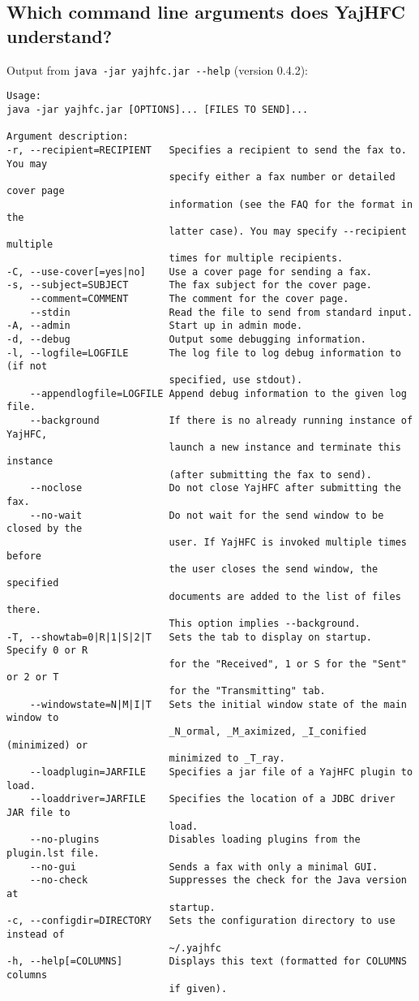 \documentclass[a4paper,10pt]{scrartcl}
\begin{document}
\subsection{Which command line arguments does YajHFC understand?}

Output from \verb#java -jar yajhfc.jar --help# (version 0.4.2):
\begin{verbatim}
Usage:
java -jar yajhfc.jar [OPTIONS]... [FILES TO SEND]...

Argument description:
-r, --recipient=RECIPIENT   Specifies a recipient to send the fax to. You may
                            specify either a fax number or detailed cover page
                            information (see the FAQ for the format in the
                            latter case). You may specify --recipient multiple
                            times for multiple recipients.
-C, --use-cover[=yes|no]    Use a cover page for sending a fax.
-s, --subject=SUBJECT       The fax subject for the cover page.
    --comment=COMMENT       The comment for the cover page.
    --stdin                 Read the file to send from standard input.
-A, --admin                 Start up in admin mode.
-d, --debug                 Output some debugging information.
-l, --logfile=LOGFILE       The log file to log debug information to (if not
                            specified, use stdout).
    --appendlogfile=LOGFILE Append debug information to the given log file.
    --background            If there is no already running instance of YajHFC,
                            launch a new instance and terminate this instance
                            (after submitting the fax to send).
    --noclose               Do not close YajHFC after submitting the fax.
    --no-wait               Do not wait for the send window to be closed by the
                            user. If YajHFC is invoked multiple times before
                            the user closes the send window, the specified
                            documents are added to the list of files there.
                            This option implies --background.
-T, --showtab=0|R|1|S|2|T   Sets the tab to display on startup. Specify 0 or R
                            for the "Received", 1 or S for the "Sent" or 2 or T
                            for the "Transmitting" tab.
    --windowstate=N|M|I|T   Sets the initial window state of the main window to
                            _N_ormal, _M_aximized, _I_conified (minimized) or
                            minimized to _T_ray.
    --loadplugin=JARFILE    Specifies a jar file of a YajHFC plugin to load.
    --loaddriver=JARFILE    Specifies the location of a JDBC driver JAR file to
                            load.
    --no-plugins            Disables loading plugins from the plugin.lst file.
    --no-gui                Sends a fax with only a minimal GUI.
    --no-check              Suppresses the check for the Java version at
                            startup.
-c, --configdir=DIRECTORY   Sets the configuration directory to use instead of
                            ~/.yajhfc
-h, --help[=COLUMNS]        Displays this text (formatted for COLUMNS columns
                            if given).
\end{verbatim}
\end{document}
